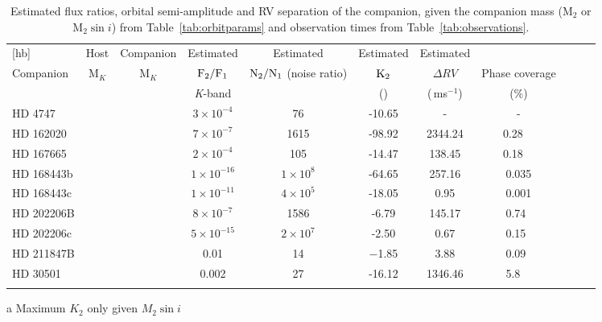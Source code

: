 \begin{table*}
        \small
        \centering
        \caption{Estimated flux ratios, orbital semi-amplitude and RV separation of the companion, given the companion mass (\(\textrm{M}_{2}\) or \(\textrm{M}_{2} \sin{i}\)) from Table~\ref{tab:orbitparams} and observation times from Table~\ref{tab:observations}.} 
        \begin{tabular}{l | c c c c c c c | c c c}[hb]
            \toprule
            & Host& Companion &  Estimated  & Estimated &  Estimated & Estimated &  &    \\  %
            Companion     & M$_{K}$& M$_{K}$& \(\rm F_{2}/F_{1} \)   & \(\rm N_{2}/N_{1} \) (noise ratio) & \(\rm K_2\) &   \(\Delta RV\) & Phase coverage \\
            & & & \textit{K}-band     & & (\kmps{}) & (\,ms\(^{-1}\)) & (\%) \\
            \midrule
            {HD 4747}        & & & \(3\times10^{-4} \)   & 76 &  -10.65 & -  &  -  \\  %
            {HD 162020}   & & & \(7\times10^{-7} \)   & 1615  &  -98.92\tnote{a} &  2344.24     & 0.28~~  \\  %
            {HD 167665}    & & & \(2\times10^{-4} \)   &  105    &  -14.47\tnote{a}  &   138.45     & 0.18~~  \\  %
            {HD 168443b} & & & \(1\times10^{-16} \)  &    \(1\times10^{8} \)   &  -64.65\tnote{a}&   257.16   & 0.035 \\ 
            {HD 168443c} & & &  \(1\times10^{-11} \)  &   \(4\times10^{5} \)     &  -18.05\tnote{a}  &   0.95   &  0.001 \\  %
            {HD 202206}B  & & & \(8\times10^{-7} \)  &   1586 &  -6.79 & 145.17   & 0.74~  \\  %
            {HD 202206}c  & & &  \(5\times10^{-15}\)   &     \(2\times10^{7} \) &   -2.50     &   0.67     &  0.15~  \\  %
            {HD 211847}B  & & &  0.01 &  14   & $-$1.85 & 3.88   & 0.09~  \\  %
            {HD 30501}      & & &  0.002  &  27  &  -16.12    &  1346.46      & 5.8~~  \\
            \bottomrule& & 
            \end{tabular}
    \begin{tablenotes}
        \item[a] {Maximum \(K_2\) only given \(M_2 \sin{i}\)}
      \end{tablenotes}
    \label{tab:estimatedparameters}
\end{table*}